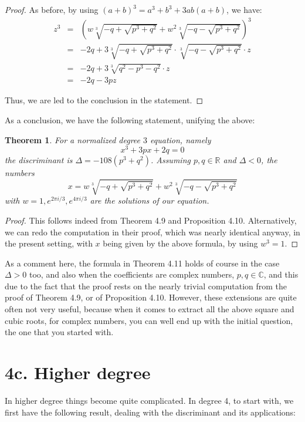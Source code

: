 \documentclass[12pt]{amsbook}
\newtheorem{theorem}{Theorem}[chapter]
\begin{document}
\begin{proof}
As before, by using $(a+b)^3=a^3+b^3+3ab(a+b)$, we have:
\begin{eqnarray*}
z^3
&=&\left(w\sqrt[3]{-q+\sqrt{p^3+q^2}}+w^2\sqrt[3]{-q-\sqrt{p^3+q^2}}\right)^3\\
&=&-2q+3\sqrt[3]{-q+\sqrt{p^3+q^2}}\cdot\sqrt[3]{-q-\sqrt{p^3+q^2}}\cdot z\\
&=&-2q+3\sqrt[3]{q^2-p^3-q^2}\cdot z\\
&=&-2q-3pz
\end{eqnarray*}

Thus, we are led to the conclusion in the statement.
\end{proof}

As a conclusion, we have the following statement, unifying the above:


\begin{theorem}
For a normalized degree $3$ equation, namely 
$$x^3+3px+2q=0$$
the discriminant is $\Delta=-108(p^3+q^2)$. Assuming $p,q\in\mathbb R$ and $\Delta<0$, the numbers
$$x=w\sqrt[3]{-q+\sqrt{p^3+q^2}}+w^2\sqrt[3]{-q-\sqrt{p^3+q^2}}$$
with $w=1,e^{2\pi i/3},e^{4\pi i/3}$ are the solutions of our equation.
\end{theorem}

\begin{proof}
This follows indeed from Theorem 4.9 and Proposition 4.10. Alternatively, we can redo the computation in their proof, which was nearly identical anyway, in the present setting, with $x$ being given by the above formula, by using $w^3=1$.
\end{proof}

As a comment here, the formula in Theorem 4.11 holds of course in the case $\Delta>0$ too, and also when the coefficients are complex numbers, $p,q\in\mathbb C$, and this due to the fact that the proof rests on the nearly trivial computation from the proof of Theorem 4.9, or of Proposition 4.10. However, these extensions are quite often not very useful, because when it comes to extract all the above square and cubic roots, for complex numbers, you can well end up with the initial question, the one that you started with. 

\section*{4c. Higher degree}

In higher degree things become quite complicated. In degree 4, to start with, we first have the following result, dealing with the discriminant and its applications:
\end{document}

